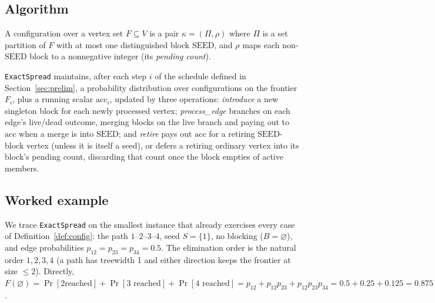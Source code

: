 \documentclass[ijoc,sglanonrev]{informs4}
\begin{document}
\subsection{Algorithm}\label{sec:twig-algo}

\begin{definition}[Configuration]\label{def:config}
A configuration over a vertex set $F\subseteq V$ is a pair
$\kappa=(\Pi,\rho)$ where $\Pi$ is a set partition of $F$ with at most one
distinguished block $\mathrm{SEED}$, and $\rho$ maps each non-$\mathrm{SEED}$
block to a nonnegative integer (its \emph{pending count}).
\end{definition}

\texttt{ExactSpread} maintains, after each step $i$ of the schedule defined
in Section~\ref{sec:prelim}, a probability distribution over configurations
on the frontier $F_i$, plus a running scalar $\mathrm{acc}_i$, updated by
three operations: \emph{introduce} a new singleton block for each newly
processed vertex; \emph{process\_edge} branches on each edge's live/dead
outcome, merging blocks on the live branch and paying out to $\mathrm{acc}$
when a merge is into $\mathrm{SEED}$; and \emph{retire} pays out $\mathrm{acc}$
for a retiring $\mathrm{SEED}$-block vertex (unless it is itself a seed), or
defers a retiring ordinary vertex into its block's pending count, discarding
that count once the block empties of active members.

\subsection{Worked example}\label{sec:twig-example}

We trace \texttt{ExactSpread} on the smallest instance that already
exercises every case of Definition~\ref{def:config}: the path
$1$--$2$--$3$--$4$, seed $S=\{1\}$, no blocking ($B=\varnothing$), and edge
probabilities $p_{12}=p_{23}=p_{34}=0.5$. The elimination order is the
natural order $1,2,3,4$ (a path has treewidth 1 and either direction keeps
the frontier at size $\le2$). Directly, $F(\varnothing)=\Pr[2\text{
reached}]+\Pr[3\text{ reached}]+\Pr[4\text{ reached}]
=p_{12}+p_{12}p_{23}+p_{12}p_{23}p_{34}=0.5+0.25+0.125=0.875$.
\end{document}
